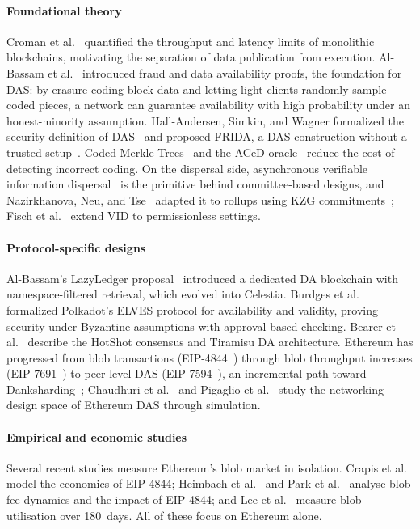 \paragraph{Foundational theory}
Croman et al.~\cite{Croman2016Scaling} quantified the throughput and latency limits of monolithic blockchains, motivating the separation of data publication from execution.
Al-Bassam et al.~\cite{AlBassam_FraudDA} introduced fraud and data availability proofs, the foundation for DAS: by erasure-coding block data and letting light clients randomly sample coded pieces, a network can guarantee availability with high probability under an honest-minority assumption.
Hall-Andersen, Simkin, and Wagner formalized the security definition of DAS~\cite{HallAndersen2025FoundationsDAS} and proposed FRIDA, a DAS construction without a trusted setup~\cite{HallAndersen2024FRIDA}.
Coded Merkle Trees~\cite{Yu2020CodedMerkle} and the ACeD oracle~\cite{Sheng2021ACeD} reduce the cost of detecting incorrect coding.
On the dispersal side, asynchronous verifiable information dispersal~\cite{Cachin2005AVID} is the primitive behind committee-based designs, and Nazirkhanova, Neu, and Tse~\cite{Nazirkhanova2022VID} adapted it to rollups using KZG commitments~\cite{KZG_Original}; Fisch et al.~\cite{Fisch2025PermissionlessVID} extend VID to permissionless settings.

\paragraph{Protocol-specific designs}
Al-Bassam's LazyLedger proposal~\cite{AlBassam_LazyLedger} introduced a dedicated DA blockchain with namespace-filtered retrieval, which evolved into Celestia.
Burdges et al.~\cite{Jeff_Burdges_ELVES} formalized Polkadot's ELVES protocol for availability and validity, proving security under Byzantine assumptions with approval-based checking.
Bearer et al.~\cite{Espresso:Hotshot_and_Triamisu} describe the HotShot consensus and Tiramisu DA architecture.
Ethereum has progressed from blob transactions (EIP-4844~\cite{EIP-4844}) through blob throughput increases (EIP-7691~\cite{EIP-7691}) to peer-level DAS (EIP-7594~\cite{EIP-7594}), an incremental path toward Danksharding~\cite{Buterin_Danksharding}; Chaudhuri et al.~\cite{CodexDAS} and Pigaglio et al.~\cite{Pigaglio2025PANDAS} study the networking design space of Ethereum DAS through simulation.

\paragraph{Empirical and economic studies}
Several recent studies measure Ethereum's blob market in isolation.
Crapis et al.~\cite{Crapis2024EIP4844Econ} model the economics of EIP-4844; Heimbach et al.~\cite{Heimbach2025BlobFee} and Park et al.~\cite{Park2026EIP4844Impact} analyse blob fee dynamics and the impact of EIP-4844; and Lee et al.~\cite{Lee2025BlobSharing} measure blob utilisation over 180~days.
All of these focus on Ethereum alone.

